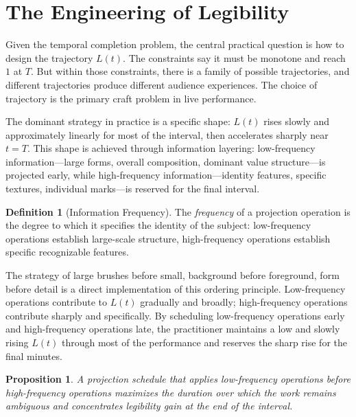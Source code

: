 \documentclass[11pt, twoside]{article}
\theoremstyle{plain}
\newtheorem{proposition}[theorem]{Proposition}
\theoremstyle{definition}
\newtheorem{definition}[theorem]{Definition}
\theoremstyle{remark}
\begin{document}
\section{The Engineering of Legibility}
\label{sec:legibility}

Given the temporal completion problem, the central practical question is how to design the trajectory $L(t)$. The constraints say it must be monotone and reach $1$ at $T$. But within those constraints, there is a family of possible trajectories, and different trajectories produce different audience experiences. The choice of trajectory is the primary craft problem in live performance.

The dominant strategy in practice is a specific shape: $L(t)$ rises slowly and approximately linearly for most of the interval, then accelerates sharply near $t = T$. This shape is achieved through information layering: low-frequency information---large forms, overall composition, dominant value structure---is projected early, while high-frequency information---identity features, specific textures, individual marks---is reserved for the final interval.

\begin{definition}[Information Frequency]
The \emph{frequency} of a projection operation is the degree to which it specifies the identity of the subject: low-frequency operations establish large-scale structure, high-frequency operations establish specific recognizable features.
\end{definition}

The strategy of large brushes before small, background before foreground, form before detail is a direct implementation of this ordering principle. Low-frequency operations contribute to $L(t)$ gradually and broadly; high-frequency operations contribute sharply and specifically. By scheduling low-frequency operations early and high-frequency operations late, the practitioner maintains a low and slowly rising $L(t)$ through most of the performance and reserves the sharp rise for the final minutes.

\begin{proposition}
\label{prop:frequency-ordering}
A projection schedule that applies low-frequency operations before high-frequency operations maximizes the duration over which the work remains ambiguous and concentrates legibility gain at the end of the interval.
\end{proposition}
\end{document}
